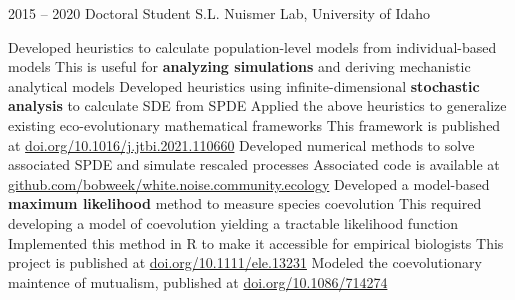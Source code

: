 \documentclass[9pt]{developercv} %
\begin{document}
\begin{entrylist}
{\begin{outline}[itemize]
                \end{outline}}                    
        \entry
        {2015 -- 2020}
        {Doctoral Student}
        {S.L. Nuismer Lab, University of Idaho}
        {\vspace{-10 pt}\begin{outline}[itemize]
            \1 Developed heuristics to calculate population-level models from individual-based models
                \vspace{-6 pt}\2[$\cdot$] This is useful for \textbf{analyzing simulations} and deriving mechanistic analytical models
            \vspace{-6 pt}\1 Developed heuristics using infinite-dimensional \textbf{stochastic analysis} to calculate SDE from SPDE
            \vspace{-6 pt}\1 Applied the above heuristics to generalize existing eco-evolutionary mathematical frameworks
                \vspace{-6 pt}\2[$\cdot$] This framework is published at \href{https://doi.org/10.1016/j.jtbi.2021.110660}{\footnotesize{doi.org/10.1016/j.jtbi.2021.110660}}
            \vspace{-6 pt}\1 Developed numerical methods to solve associated SPDE and simulate rescaled processes
                \vspace{-6 pt}\2[$\cdot$] Associated code is available at \href{https://github.com/bobweek/white.noise.community.ecology}{\footnotesize{github.com/bobweek/white.noise.community.ecology}}
            \vspace{-6 pt} \1 Developed a model-based \textbf{maximum likelihood} method to measure species coevolution
                \vspace{-6 pt}\2[$\cdot$] This required developing a model of coevolution yielding a tractable likelihood function
                \vspace{-3 pt}\2[$\cdot$] Implemented this method in R to make it accessible for empirical biologists
                \vspace{-3 pt}\2[$\cdot$] This project is published at \href{https://doi.org/10.1111/ele.13231}{\footnotesize{doi.org/10.1111/ele.13231}}
            \vspace{-6 pt} \1 Modeled the coevolutionary maintence of mutualism, published at \href{https://doi.org/10.1086/714274}{\footnotesize{doi.org/10.1086/714274}}
        \end{outline}}
\end{entrylist}
\end{document}

